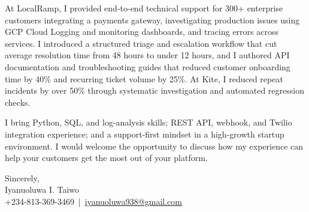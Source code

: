 \documentclass[a4paper, 12pt]{article}
\begin{document}
	At LocalRamp, I provided end-to-end technical support for 300+ enterprise
	customers integrating a payments gateway, investigating production issues using
	GCP Cloud Logging and monitoring dashboards, and tracing errors across services.
	I introduced a structured triage and escalation workflow that cut average
	resolution time from 48 hours to under 12 hours, and I authored API
	documentation and troubleshooting guides that reduced customer onboarding time
	by 40\% and recurring ticket volume by 25\%. At Kite, I reduced repeat incidents
	by over 50\% through systematic investigation and automated regression checks.

	I bring Python, SQL, and log-analysis skills; REST API, webhook, and Twilio
	integration experience; and a support-first mindset in a high-growth startup
	environment. I would welcome the opportunity to discuss how my experience can
	help your customers get the most out of your platform.

	\vspace{10pt}

	\noindent
	Sincerely,\\ Iyanuoluwa I. Taiwo\\ +234-813-369-3469 \,|\, \href{mailto:iyanuoluwa938@gmail.com}{iyanuoluwa938@gmail.com}
\end{document}

